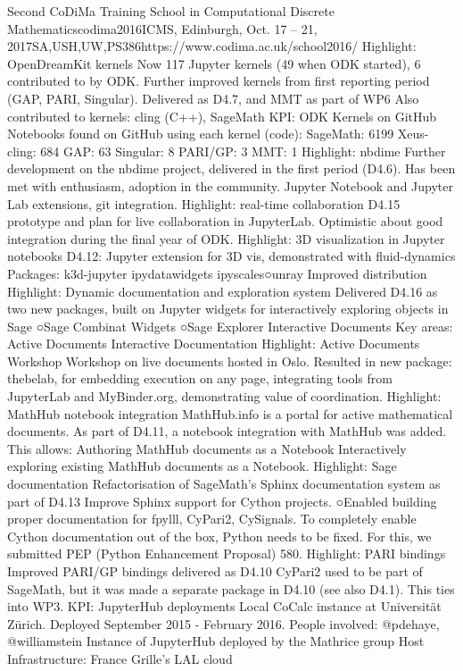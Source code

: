 \begin{Aim 1}
\begin{Aim 2}
\begin{event}{Second CoDiMa Training School in Computational Discrete Mathematics}{codima2016}{ICMS, Edinburgh, Oct. 17 -- 21, 2017}{SA,USH,UW,PS}{38}{6}{https://www.codima.ac.uk/school2016/}
Highlight: OpenDreamKit kernels
Now 117 Jupyter kernels (49 when ODK started), 6 contributed to by ODK.
Further improved kernels from first reporting period (GAP, PARI, Singular). 
Delivered as D4.7, and MMT as part of WP6
Also contributed to kernels: cling (C++), SageMath
KPI: ODK Kernels on GitHub
Notebooks found on GitHub using each kernel (code):
SageMath: 6199
Xeus-cling: 684
GAP: 63
Singular: 8
PARI/GP: 3
MMT: 1
Highlight: nbdime
Further development on the nbdime project, delivered in the first period 
(D4.6). Has been met with enthusiasm, adoption in the community.
Jupyter Notebook and Jupyter Lab extensions, git integration.
Highlight: real-time collaboration
D4.15 prototype and plan for live collaboration in JupyterLab.
Optimistic about good integration during the final year of ODK.
Highlight: 3D visualization in Jupyter notebooks
D4.12: Jupyter extension for 3D vis, demonstrated with fluid-dynamics
Packages:
k3d-jupyter
ipydatawidgets
ipyscales○unray
Improved distribution
Highlight: Dynamic documentation and exploration system
Delivered D4.16 as two new packages, 
built on Jupyter widgets for interactively 
exploring objects in Sage
○Sage Combinat Widgets
○Sage Explorer
Interactive Documents
Key areas:
Active Documents
Interactive Documentation
Highlight: Active Documents Workshop
Workshop on live documents hosted in Oslo. Resulted in new package: 
thebelab, for embedding execution on any page, integrating tools from 
JupyterLab and MyBinder.org, demonstrating value of coordination.
Highlight: MathHub notebook integration
MathHub.info is a portal for active mathematical documents. As part of D4.11, a 
notebook integration with MathHub was added. This allows:
Authoring MathHub documents as a Notebook
Interactively exploring existing MathHub documents as a Notebook.
Highlight: Sage documentation
Refactorisation of SageMath’s Sphinx documentation system as part of D4.13
Improve Sphinx support for Cython projects.
○Enabled building proper documentation for fpylll, CyPari2, CySignals.
To completely enable Cython documentation out of the box, Python needs to 
be fixed. For this, we submitted PEP (Python Enhancement Proposal) 580.
Highlight: PARI bindings
Improved PARI/GP bindings delivered as D4.10
CyPari2 used to be part of SageMath, but it was made a separate package in 
D4.10 (see also D4.1). This ties into WP3.
KPI: JupyterHub deployments
Local CoCalc instance at Universität Zürich.
Deployed September 2015 - February 2016.
People involved: @pdehaye, @williamstein
Instance of JupyterHub
 deployed by the 
Mathrice group
Host Infrastructure: France Grille's LAL cloud

\end{event}
\end{Aim 2}
\end{Aim 1}
